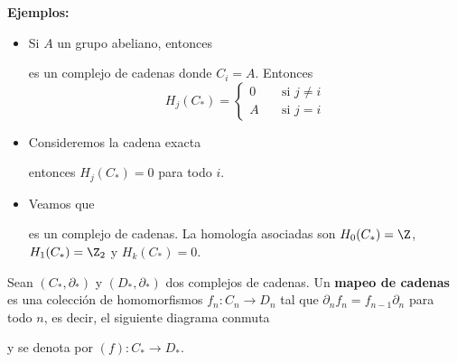 \documentclass{article}
\begin{document}
\vspace{2mm}
\noindent\textbf{Ejemplos:}
\begin{itemize}
    \item Si $A$ un grupo abeliano, entonces
    
    \vspace{2mm}
    \centerline{
    }
    \vspace{2mm}
    es un complejo de cadenas donde $C_{i}=A$. Entonces
    \begin{equation*}
        H_{j}(C_{*})=\begin{cases}
            0 & \quad\text{si }j\neq i \\
            A & \quad\text{si }j=i
        \end{cases}
    \end{equation*}

    \item Consideremos la cadena exacta
    
    \vspace{2mm}
    \centerline{
    }
    \vspace{2mm}
    entonces $H_{j}(C_{*})=0$ para todo $i$.

    \item Veamos que
    
    \vspace{2mm}
    \centerline{
    }
    \vspace{2mm}    
    es un complejo de cadenas. La homología asociadas son $H_{0}(C_{*})=\Z$, $H_{1}(C_{*})=\Z_{2}$
    y $H_{k}(C_{*})=0$.
\end{itemize}

\begin{dfn}
    Sean $(C_{*},\partial_{*})$ y $(D_{*},\partial_{*})$ dos complejos de cadenas. Un 
    \textbf{mapeo de cadenas} es una colección de homomorfismos $f_{n}:C_{n}\to D_{n}$ tal que 
    $\partial_{n}f_{n}=f_{n-1}\partial_{n}$ para todo $n$, es decir, el siguiente diagrama conmuta

    \vspace{2mm}
    \centerline{
    }
    \noindent y se denota por $(f):C_{*}\to D_{*}$.
\end{dfn}
\end{document}
